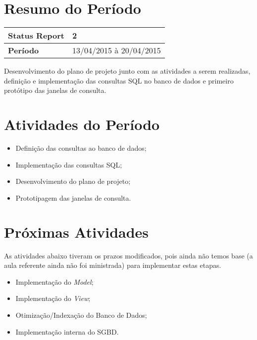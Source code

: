 \documentclass[a4paper,12pt]{article}
\begin{document}

\newpage

\section{Resumo do Período}

\begin{longtable}{|l|l|}
\hline
\textbf{Status Report} & 2\\
\hline
\textbf{Período}	&	13/04/2015 à 20/04/2015 \\
\hline
\end{longtable}

Desenvolvimento do plano de projeto junto com as atividades a serem realizadas, definição e implementação das consultas SQL no banco de dados e primeiro protótipo das janelas de consulta.

\section{Atividades do Período}

\begin{itemize}

\item{Definição das consultas ao banco de dados;}
\item{Implementação das consultas SQL;}
\item{Desenvolvimento do plano de projeto;}
\item{Prototipagem das janelas de consulta.}


\end{itemize}

\section{Próximas Atividades}

As atividades abaixo tiveram os prazos modificados, pois ainda não temos base (a aula referente ainda não foi ministrada) para implementar estas etapas.

\begin{itemize}

\item{Implementação do \textit{Model};}
\item{Implementação do \textit{View};}
\item{Otimização/Indexação do Banco de Dados;}
\item{Implementação interna do SGBD.}

\end{itemize}
\end{document}
